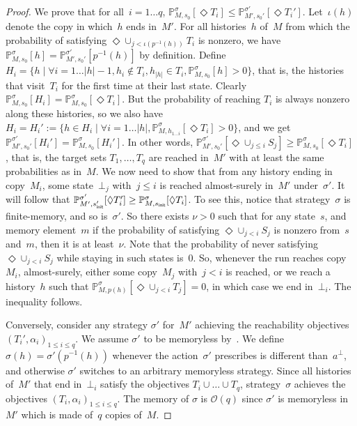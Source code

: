 \documentclass{llncs}
\newcommand{\initState}{\ensuremath{s_{{\sf init}}} }
\newcommand*{\pr}{\mathbb{P}}
\begin{document}
\begin{proof}
  We prove that for all~$i=1\ldots q$, $\pr_{M,s_0}^\sigma[\Diamond T_i] \leq \pr_{M',s_0'}^{\sigma'}[\Diamond T_i']$.
  Let~$\iota(h)$ denote the copy in which~$h$ ends in~$M'$.
  For all histories~$h$ of~$M$ from which the probability of satisfying $\Diamond \cup_{j < \iota(p^{-1}(h))}T_i$ is nonzero,
  we have $\pr_{M,s_0}^\sigma[h] = \pr_{M',s_0'}^{\sigma'}[p^{-1}(h)]$ by definition.
  Define $H_i = \{h \mid \forall i=1\ldots |h|-1, h_i \not \in T_i, h_{|h|} \in T_i, \pr_{M,s_0}^\sigma[h]>0\}$,
  that is, the histories that visit~$T_i$ for the first time at their last state.
  Clearly $\pr_{M,s_0}^\sigma[H_i] = \pr_{M,s_0}^{\sigma}[\Diamond T_i]$.
  But the probability of reaching  $T_i$ is always nonzero along these histories, so 
  we also have $H_i = H_i' := \{h \in H_i \mid \forall i=1\ldots|h|, \pr_{M,h_{1\ldots i}}^\sigma[\Diamond T_i]>0\}$,
  and we get $\pr_{M',s_0'}^{\sigma'}[H_i'] = \pr_{M,s_0}^{\sigma}[H_i']$.
  In other words, $\pr_{M',s_0'}^{\sigma'}[\Diamond \cup_{j \leq i} S_j] \geq \pr_{M,s_0}^\sigma[\Diamond T_i]$,
  that is, the target sets $T_1,\ldots,T_q$ are reached in~$M'$ with at least the same probabilities as in~$M$.
  We now need to show that from any history ending in copy~$M_i$, some state~$\bot_j$ with~$j\leq i$
  is reached almost-surely in~$M'$ under~$\sigma'$. It will follow that
  $\pr_{M',\initState'}^{\sigma'}[\Diamond T_i'] \geq \pr_{M,\initState}^\sigma[\Diamond T_i]$.
  To see this, notice that strategy~$\sigma$ is finite-memory, and so is~$\sigma'$. 
  So there exists $\nu>0$ such that for any state~$s$, and memory element~$m$
  if the probability of satisfying $\Diamond \cup_{j < i} S_j$ is nonzero from~$s$ and~$m$, 
  then it is at least~$\nu$. Note that the probability of never satisfying
  $\Diamond \cup_{j < i} S_j$ while staying in such states is~$0$.
  So, whenever the run reaches copy~$M_i$, almost-surely,
  either some copy~$M_j$ with~$j<i$ is reached, or we reach a history~$h$ such that $\pr_{M,p(h)}^{\sigma}[\Diamond \cup_{j < i} T_j] = 0$, in which case we end in~$\bot_i$.
  The inequality follows.


  Conversely, consider any strategy $\sigma'$ for~$M'$ achieving the reachability objectives $(T_i',\alpha_i)_{1\leq i\leq q}$.
  We assume $\sigma'$ to be memoryless by~\cite{EKVY-lmcs08}.
  We define~$\sigma(h) = \sigma'(p^{-1}(h))$ whenever the action~$\sigma'$ prescribes is different than~$a^\bot$, and otherwise
  $\sigma'$ switches to an arbitrary memoryless strategy. Since all histories of~$M'$ that end in~$\bot_i$ satisfy the objectives
  $T_i\cup\ldots\cup T_q$, strategy~$\sigma$ achieves the objectives $(T_i,\alpha_i)_{1\leq i\leq q}$.
  The memory of $\sigma$ is $\mathcal{O}(q)$ since $\sigma'$ is memoryless in~$M'$ which is made of~$q$ copies of~$M$.


\end{proof}
\end{document}
